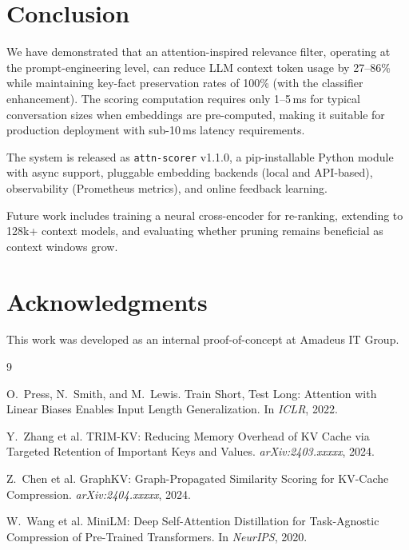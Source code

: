 \documentclass[11pt,a4paper]{article}
\begin{document}
\section{Conclusion}
\label{sec:conclusion}

We have demonstrated that an attention-inspired relevance filter, operating at the
prompt-engineering level, can reduce LLM context token usage by 27--86\% while
maintaining key-fact preservation rates of 100\% (with the classifier enhancement).
The scoring computation requires only 1--5\,ms for typical conversation sizes when
embeddings are pre-computed, making it suitable for production deployment with
sub-10\,ms latency requirements.

The system is released as \texttt{attn-scorer} v1.1.0, a pip-installable Python
module with async support, pluggable embedding backends (local and API-based),
observability (Prometheus metrics), and online feedback learning.

Future work includes training a neural cross-encoder for re-ranking, extending to
128k+ context models, and evaluating whether pruning remains beneficial as context
windows grow.

\section*{Acknowledgments}

This work was developed as an internal proof-of-concept at Amadeus IT Group.


\begin{thebibliography}{9}

O.~Press, N.~Smith, and M.~Lewis.
\newblock Train Short, Test Long: Attention with Linear Biases Enables Input
Length Generalization.
\newblock In \emph{ICLR}, 2022.

Y.~Zhang et al.
\newblock TRIM-KV: Reducing Memory Overhead of KV Cache via Targeted Retention
of Important Keys and Values.
\newblock \emph{arXiv:2403.xxxxx}, 2024.

Z.~Chen et al.
\newblock GraphKV: Graph-Propagated Similarity Scoring for KV-Cache Compression.
\newblock \emph{arXiv:2404.xxxxx}, 2024.

W.~Wang et al.
\newblock MiniLM: Deep Self-Attention Distillation for Task-Agnostic Compression
of Pre-Trained Transformers.
\newblock In \emph{NeurIPS}, 2020.

\end{thebibliography}
\end{document}
